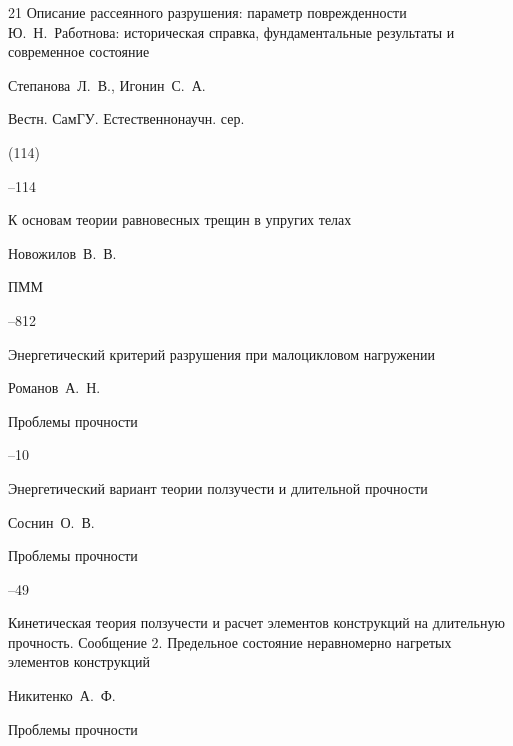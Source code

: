 \begin{thebibliography}{21}
\paper Описание рассеянного разрушения: параметр поврежденности Ю.~Н.~Работнова: историческая справка, фундаментальные результаты и современное состояние

\by Степанова~Л.~В., Игонин~С.~А.

\jour Вестн. СамГУ. Естественнонаучн. сер.


(114)

--114





\paper К основам теории равновесных трещин в упругих телах

\by Новожилов~В.~В.

\jour ПММ



--812




\paper Энергетический критерий разрушения при малоцикловом нагружении

\by Романов~А.~Н.

\jour Проблемы прочности



--10




\paper Энергетический вариант теории ползучести и длительной прочности

\by Соснин~О.~В.

\jour Проблемы прочности



--49




\paper Кинетическая теория ползучести и расчет элементов конструкций на длительную прочность. Сообщение 2. Предельное состояние неравномерно нагретых элементов конструкций

\by Никитенко~А.~Ф.

\jour Проблемы прочности




\end{thebibliography}
